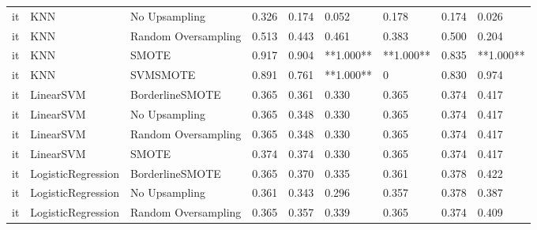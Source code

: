 \begin{tabular}{lllllllll}
      it &                          KNN &       No Upsampling & 0.326 &                     0.174 &                 0.052 &                  0.178 &                                   0.174 &     0.026 \\
      it &                          KNN & Random Oversampling & 0.513 &                     0.443 &                 0.461 &                  0.383 &                                   0.500 &     0.204 \\
      it &                          KNN &               SMOTE & 0.917 &                     0.904 &             **1.000** &              **1.000** &                                   0.835 & **1.000** \\
      it &                          KNN &            SVMSMOTE & 0.891 &                     0.761 &             **1.000** &                      0 &                                   0.830 &     0.974 \\
      it &                    LinearSVM &     BorderlineSMOTE & 0.365 &                     0.361 &                 0.330 &                  0.365 &                                   0.374 &     0.417 \\
      it &                    LinearSVM &       No Upsampling & 0.365 &                     0.348 &                 0.330 &                  0.365 &                                   0.374 &     0.417 \\
      it &                    LinearSVM & Random Oversampling & 0.365 &                     0.348 &                 0.330 &                  0.365 &                                   0.374 &     0.417 \\
      it &                    LinearSVM &               SMOTE & 0.374 &                     0.374 &                 0.330 &                  0.365 &                                   0.374 &     0.417 \\
      it &           LogisticRegression &     BorderlineSMOTE & 0.365 &                     0.370 &                 0.335 &                  0.361 &                                   0.378 &     0.422 \\
      it &           LogisticRegression &       No Upsampling & 0.361 &                     0.343 &                 0.296 &                  0.357 &                                   0.378 &     0.387 \\
      it &           LogisticRegression & Random Oversampling & 0.365 &                     0.357 &                 0.339 &                  0.365 &                                   0.374 &     0.409 \\

\end{tabular}
